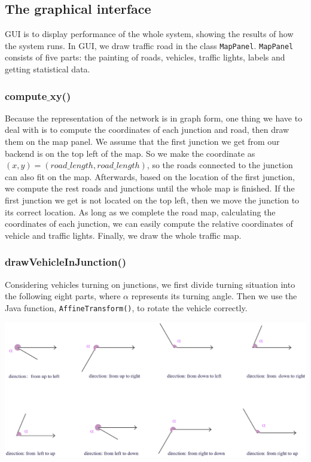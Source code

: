 \documentclass[a4paper,12pt]{article}
\begin{document}
\subsection{The graphical interface}

GUI is to display performance of the whole system, showing the results of how the system runs. In GUI, we draw traffic road in the class \verb|MapPanel|. \verb|MapPanel| consists of five parts: the painting of roads, vehicles, traffic lights, labels and getting statistical data.

\subsubsection{compute$\_$xy()}
Because the representation of the network is in graph form, one thing we have to deal with is to compute the coordinates of each junction and road, then draw them on the map panel. We assume that the first junction we get from our backend is on the top left of the map. So we make the coordinate as $(x,y)=(road\_length, road\_length)$, so the roads connected to the junction can also fit on the map. Afterwards, based on the location of the first junction, we compute the rest roads and junctions until the whole map is finished. If the first junction we get is not located on the top left, then we move the junction to its correct location. As long as we complete the road map, calculating the coordinates of each junction, we can easily compute the relative coordinates of vehicle and traffic lights. Finally, we draw the whole traffic map.

\subsubsection{drawVehicleInJunction()}
Considering vehicles turning on junctions, we first divide turning situation into the following eight parts, where $\alpha$ represents its turning angle. Then we use the Java function, \verb|AffineTransform()|, to rotate the vehicle correctly.
\begin{center}
	\includegraphics[width=14cm]{GUI_p1.eps}
\end{center}
\end{document}

